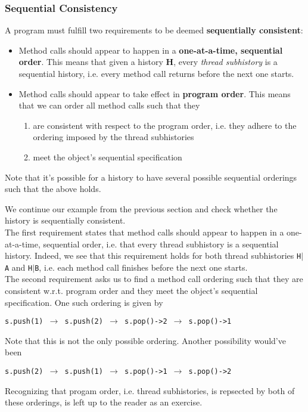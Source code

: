 \documentclass[main]{subfiles}
\begin{document}

\subsubsection{Sequential Consistency} \label{sequentially consistent}
\begin{definition}
    A program must fulfill two requirements to be deemed \textbf{sequentially consistent}:
    \begin{itemize}
        \item Method calls should appear to happen in a \textbf{one-at-a-time, sequential order}. This means that given a history \textbf{H}, every \textit{thread subhistory} is a sequential history, i.e. every method call returns before the next one starts.
        \item Method calls should appear to take effect in \textbf{program order}. This means that we can order all method calls such that they
            \begin{enumerate}
                \item are consistent with respect to the program order, i.e. they adhere to the ordering imposed by the thread subhistories
                \item meet the object's sequential specification
            \end{enumerate} 
    \end{itemize} 
\end{definition}
Note that it's possible for a history to have several possible sequential orderings such that the above holds.
\begin{example}
    We continue our example from the previous section and check whether the history is sequentially consistent.\\[3mm]
    The first requirement states that method calls should appear to happen in a one-at-a-time, sequential order, i.e. that every thread subhistory is a sequential history. Indeed, we see that this requirement holds for both thread subhistories \texttt{H$\mid$A} and \texttt{H$\mid$B}, i.e. each method call finishes before the next one starts.\\[3mm]
    The second requirement asks us to find a method call ordering such that they are consistent w.r.t. program order and they meet the object's sequential specification. One such ordering is given by
    \begin{center}
        \texttt{s.push(1) $\rightarrow$ s.push(2) $\rightarrow$ s.pop()->2 $\rightarrow$ s.pop()->1}
    \end{center}
    Note that this is not the only possible ordering. Another possibility would've been
    \begin{center}
        \texttt{s.push(2) $\rightarrow$ s.push(1) $\rightarrow$ s.pop()->1 $\rightarrow$ s.pop()->2}
    \end{center}
    Recognizing that progam order, i.e. thread subhistories, is repsected by both of these orderings, is left up to the reader as an exercise.
\end{example}
\end{document}
